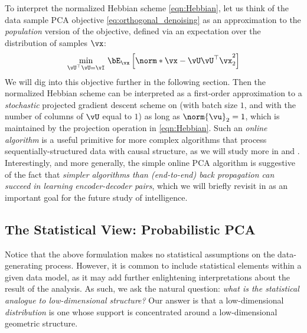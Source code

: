 \documentclass[../../book-main.tex]{subfiles}
\begin{document}
To interpret the normalized Hebbian scheme \eqref{eqn:Hebbian}, let us think of
the data sample PCA objective \eqref{eq:orthogonal_denoising} as an
approximation to the \textit{population} version of the objective, defined via
an expectation over the distribution of samples $\vx$:
\begin{equation}\label{eq:pca-reconstruction-expectation}
    \min_{\vU^\top \vU = \vI}\, \bE_{\vx}\left[\norm*{\vx
    - \vU\vU^\top \vx}_2^2\right]
\end{equation}
We will dig into this objective further in the following section.
Then the normalized Hebbian scheme can be interpreted as
a first-order approximation to a \textit{stochastic} projected
gradient descent scheme on
 (with batch size
$1$, and with the number of columns of $\vU$ equal to $1$) as long as
$\norm{\vu}_2 = 1$, which is maintained by the projection operation in
\eqref{eqn:Hebbian}.
Such an \textit{online algorithm} is a useful primitive for more complex
algorithms that process sequentially-structured data with causal
structure, as we will study more in  and
. Interestingly, and more generally, the simple
online PCA algorithm is suggestive
of the fact that \textit{simpler algorithms than (end-to-end) back
propagation can succeed in learning encoder-decoder pairs}, which we
will briefly revisit in  as an important goal for the
future study of intelligence.

\subsection{The Statistical View: Probabilistic
PCA}\label{subsec:probabilistic PCA}

Notice that the above formulation makes no statistical assumptions on the
data-generating process. However, it is common to include statistical elements
within a given data model, as it may add further enlightening interpretations
about the result of the analysis. As such, we ask the natural question:
\textit{what is the statistical analogue to low-dimensional
structure?} Our answer is that a low-dimensional
\textit{distribution} is one whose support is concentrated around a
low-dimensional geometric structure.
\end{document}
